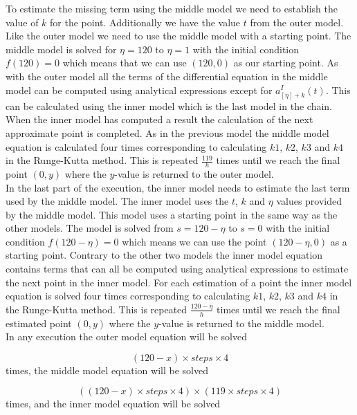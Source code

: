 	To estimate the missing term using the middle model we need to establish the value of $k$ for the point. Additionally we have the value $t$ from the outer model. Like the outer model we need to use the middle model with a starting point. The middle model is solved for $\eta = 120$ to $\eta = 1$ with the initial condition $f(120) = 0$ which means that we can use $(120,0)$ as our starting point. As with the outer model all the terms of the differential equation in the middle model can be computed using analytical expressions except for $a_{[\eta]+k}^I(t)$. This can be calculated using the inner model which is the last model in the chain. When the inner model has computed a result the calculation of the next approximate point is completed. As in the previous model the middle model equation is calculated four times corresponding to calculating $k1$, $k2$, $k3$ and $k4$ in the Runge-Kutta method. This is repeated $\frac{119}{h}$ times until we reach the final point $(0,y)$ where the $y$-value is returned to the outer model. \\
	
	In the last part of the execution, the inner model needs to estimate the last term used by the middle model. The inner model uses the $t$, $k$ and $\eta$ values provided by the middle model. This model uses a starting point in the same way as the other models. The model is solved from $s = 120 - \eta$ to $s=0$ with the initial condition $f(120 - \eta) = 0$ which means we can use the point $(120-\eta,0)$ as a starting point. Contrary to the other two models the inner model equation contains terms that can all be computed using analytical expressions to estimate the next point in the inner model. For each estimation of a point the inner model equation is solved four times corresponding to calculating $k1$, $k2$, $k3$ and $k4$ in the Runge-Kutta method. This is repeated $\frac{120 - \eta}{h}$ times until we reach the final estimated point $(0,y)$ where the $y$-value is returned to the middle model. \\ 
	
	\noindent In any execution the outer model equation will be solved 
	
	\begin{equation}
	(120-x) \times steps \times 4
	\end{equation} times, the middle model equation will be solved 
	
	\begin{equation}
	((120-x) \times steps \times 4) \times (119 \times steps \times 4)
	\end{equation} times, and the inner model equation will be solved 
	
